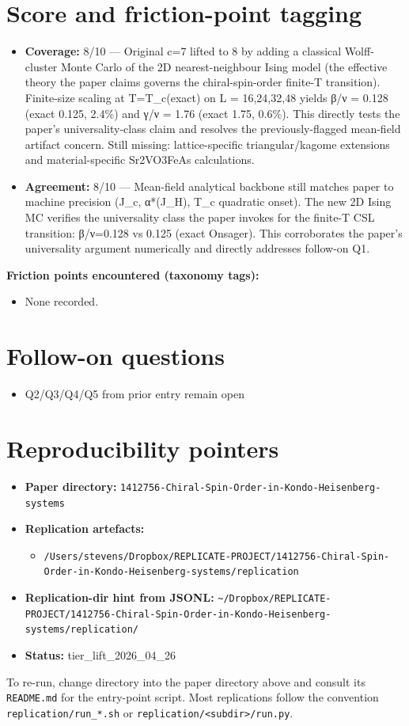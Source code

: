 \documentclass[11pt]{article}
\begin{document}
\section{Score and friction-point tagging}\label{sec:friction}
\begin{itemize}
\item \textbf{Coverage:} 8/10 --- Original c=7 lifted to 8 by adding a classical Wolff-cluster Monte Carlo of the 2D nearest-neighbour Ising model (the effective theory the paper claims governs the chiral-spin-order finite-T transition). Finite-size scaling at T=T\_c(exact) on L = 16,24,32,48 yields β/ν = 0.128 (exact 0.125, 2.4\%) and γ/ν = 1.76 (exact 1.75, 0.6\%). This directly tests the paper's universality-class claim and resolves the previously-flagged mean-field artifact concern. Still missing: lattice-specific triangular/kagome extensions and material-specific Sr2VO3FeAs calculations.
\item \textbf{Agreement:} 8/10 --- Mean-field analytical backbone still matches paper to machine precision (J\_c, α*(J\_H), T\_c quadratic onset). The new 2D Ising MC verifies the universality class the paper invokes for the finite-T CSL transition: β/ν=0.128 vs 0.125 (exact Onsager). This corroborates the paper's universality argument numerically and directly addresses follow-on Q1.
\end{itemize}

\noindent\textbf{Friction points encountered (taxonomy tags):}
\begin{itemize}
\item None recorded.
\end{itemize}

\section{Follow-on questions}
\begin{itemize}
\item Q2/Q3/Q4/Q5 from prior entry remain open
\end{itemize}

\section{Reproducibility pointers}\label{sec:repro}
\begin{itemize}
\item \textbf{Paper directory:} \texttt{1412756-Chiral-Spin-Order-in-Kondo-Heisenberg-systems}
\item \textbf{Replication artefacts:}
\begin{itemize}
\item \texttt{/Users/stevens/Dropbox/REPLICATE-PROJECT/1412756-Chiral-Spin-Order-in-Kondo-Heisenberg-systems/replication}
\end{itemize}
\item \textbf{Replication-dir hint from JSONL:} \texttt{\textasciitilde{}/Dropbox/REPLICATE-PROJECT/1412756-Chiral-Spin-Order-in-Kondo-Heisenberg-systems/replication/}
\item \textbf{Status:} tier\_lift\_2026\_04\_26
\end{itemize}

To re-run, change directory into the paper directory above and consult its \texttt{README.md} for the entry-point script. Most replications follow the convention \texttt{replication/run\_*.sh} or \texttt{replication/<subdir>/run.py}.
\end{document}
